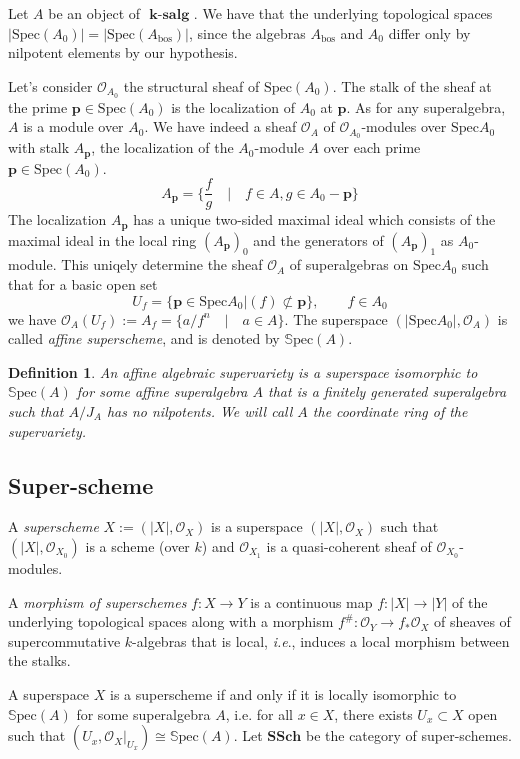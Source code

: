 \documentclass[12pt, reqno]{amsart}
\theoremstyle{plain}
\newtheorem{definition}[theorem]{Definition}
\numberwithin{equation}{section}
\newcommand{\salg} {\textbf{ k-salg }}
\newcommand\spec{{\mathrm{Spec}}}
\newcommand{\bp} {\mathbf {p}}
\newcommand{\mc}[1]{\mathcal{#1}}
\newcommand{\stsheaf}[1]{\mathcal{O}_{#1}}
\newcommand{\est}[1]{\mathcal{O}_{{#1}_0}}
\newcommand{\ost}[1]{\mathcal{O}_{{#1}_1}}
\newcommand{\Spec}[1]{\mathbb{S}\mathrm{pec}(#1)}
\newcommand{\SSch}{\mathbf{SSch}}
\begin{document}
Let $A$ be an object of $\salg$. We have that the underlying topological spaces 
$|\spec(A_0)|=|\spec(A_\mathrm{bos})|$, since the
algebras $A_\mathrm{bos}$ and $A_0$ differ only by nilpotent elements by our hypothesis. 

Let's consider $\mc{O}_{A_0}$ the structural sheaf of $\spec(A_0)$.
The stalk of the sheaf at the prime $\bp\in
\spec(A_0)$ is the localization of $A_0$ at $\bp$.
As for any superalgebra, $A$ is a
module over $A_0$. We have indeed a sheaf $\mc{O}_A$ of
$\mc{O}_{A_0}$-modules over $\spec A_0$ with stalk $A_{\bp}$, the localization
of the $A_0$-module $A$ over each prime
$\bp \in \spec(A_0)$.
$$
A_{\bp}=\{ {\frac{f}{g}} \quad | \quad f\in A, g \in A_0-\bp\}
$$
The localization $A_\bp$ has a unique two-sided maximal ideal 
which consists of
the maximal ideal in the local ring
$(A_\bp)_0$ and the generators of $(A_\bp)_1$ as $A_0$-module.
This uniqely determine the sheaf $\mc{O}_A$ of superalgebras on $\spec A_0$ such that for a basic open set
$$
U_f=\{ \bp \in \spec A_0 | (f) \not\subset \bp \}, \qquad f \in A_0
$$
we have $\mc{O}_A(U_f) := A_f=\{a/f^n \quad | \quad a \in A\}$.
The superspace $(|\spec A_0|,\mc{O}_A)$ is called \textit{affine superscheme}, and is denoted by $\Spec A$.

\begin{definition}
An \textit{ affine  algebraic supervariety} is a superspace
isomorphic to $\Spec A$ for some \textit{ affine}
superalgebra $A$ that is a finitely generated superalgebra such
that $A/J_A$ has no nilpotents.
We will call
$A$ the \textit{ coordinate ring} of the supervariety.
\end{definition}

\subsection{Super-scheme}
A \emph{superscheme} $X := (|X|, \mc{O}_X)$ is a 
superspace $(|X|, \mc{O}_X)$ such that $(|X|, \est{X})$ is a 
scheme (over $k$) and $\ost{X}$ is a quasi-coherent sheaf 
of $\est{X}$-modules. 

A \emph{morphism of superschemes} 
$f:X \to Y$ is a continuous map 
$f:|X| \to |Y|$ of the underlying topological spaces along with a morphism 
$f^{\#}: \mc{O}_Y \to f_* \mc{O}_X$ of sheaves of supercommutative 
$k$-algebras that is local, \emph{i.e}., induces a local morphism 
between the stalks.

A superspace $X$ is a superscheme if and only if it is locally
isomorphic to $\Spec A$ for some superalgebra $A$, i.e.
for all $x \in X$, there exists $U_x \subset X$ open such
that $(U_x, \stsheaf{X}|_{U_x}) \cong \Spec A$. 
Let $\SSch$ be the category of super-schemes.
\end{document}
